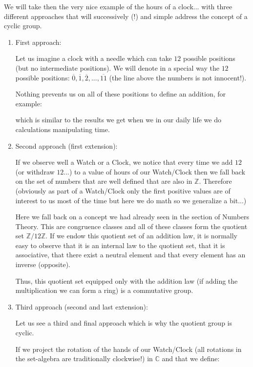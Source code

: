 	We will take then the very nice example of the hours of a clock... with three different approaches that will successively (!) and simple address the concept of a cyclic group.
	\begin{enumerate}
		\item First approach:
		
		Let us imagine a clock with a needle which can take $12$ possible positions (but no intermediate positions). We will denote in a special way the $12$ possible positions: $\overline{0},\overline{1},\overline{2},...,\overline{11}$  (the line above the numbers is not innocent!).
		
		Nothing prevents us on all of these positions to define an addition, for example:
		
	  	which is similar to the results we get when we in our daily life we do calculations manipulating time.
	  	
	  	\item Second approach (first extension):
	  	
	  	If we observe well a Watch or a Clock, we notice that every time we add $12$ (or withdraw $12$...) to a value of hours of our Watch/Clock then we fall back on the set of numbers that are well defined that are also in $\mathbb{Z}$. Therefore (obviously as part of a Watch/Clock only the first positive values are of interest to us most of the time but here we do math so we generalize a bit...)
	  	
		Here we fall back on a concept we had already seen in the section of Numbers Theory. This are congruence classes and all of these classes form the quotient set $\mathbb{Z}/12\mathbb{Z}$. If we endow this quotient set of an addition law, it is normally easy to observe that it is an internal law to the quotient set, that it is associative, that there exist a neutral element and that every element has an inverse (opposite).
		
		Thus, this quotient set equipped only with the addition law (if adding the multiplication we can form a ring) is a commutative group.

		\item Third approach (second and last extension):
		
		Let us see a third and final approach which is why the quotient group is cyclic.
		
		If we project the rotation of the hands of our Watch/Clock (all rotations in the set-algebra are traditionally clockwise!) in $\mathbb{C}$ and that we define:
		

\end{enumerate}
